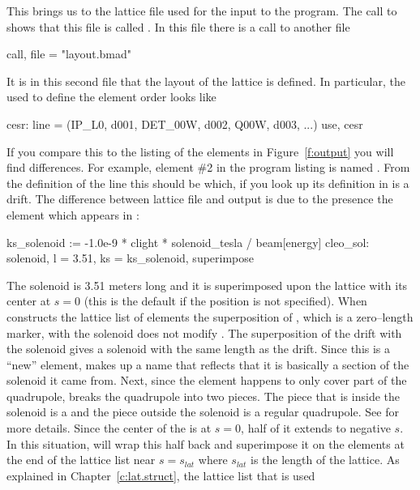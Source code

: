 {{{{{{This brings us to the lattice file used for the input to the program.
The call to  shows that this file is called 
.
In this file there is a call to another file
  \begin{example}
  call, file = "layout.bmad"
  \end{example}
It is in this second file
that the layout of the lattice is defined. In particular, the  used
to define the element order looks like
\begin{example}
  cesr: line = (IP_L0, d001, DET_00W, d002, Q00W, d003, ...)
  use, cesr
\end{example}
If you compare this to the listing of the elements in
Figure~\ref{f:output} you will find differences. For example, element
\#2 in the program listing is named . From the
definition of the  line this should be  which, if
you look up its definition in  is a drift.  The
difference between lattice file and output is due to the presence
the  element which appears in :
\begin{example}
  ks_solenoid    := -1.0e-9 * clight * solenoid_tesla / beam[energy]
  cleo_sol: solenoid, l = 3.51, ks = ks_solenoid, superimpose 
\end{example}
The solenoid is 3.51 meters long
and it is superimposed upon the lattice with its center at $s = 0$ (this
is the default if the position is not specified). 
When  constructs the lattice list of elements
the superposition of , which is a zero--length marker, with the
solenoid does not modify . The superposition of the
 drift with the solenoid gives a solenoid with the same
length as the drift. Since this is a ``new'' element, 
makes up a name that reflects that it is basically a section of the
solenoid it came from.  Next, since the  element happens to
only cover
part of the  quadrupole,  breaks the
quadrupole into two pieces. The piece that is inside the solenoid is a
 and the piece outside the solenoid is a regular
quadrupole. See  for more details. Since the
center of the  is at $s = 0$, half of it extends to
negative $s$. In this situation,  will wrap this half
back and superimpose it on the elements at the end of the lattice list
near $s = s_{lat}$ where $s_{lat}$ is the length of the lattice.  As
explained in Chapter~\ref{c:lat.struct}, the lattice list that is used
}}}}}}
